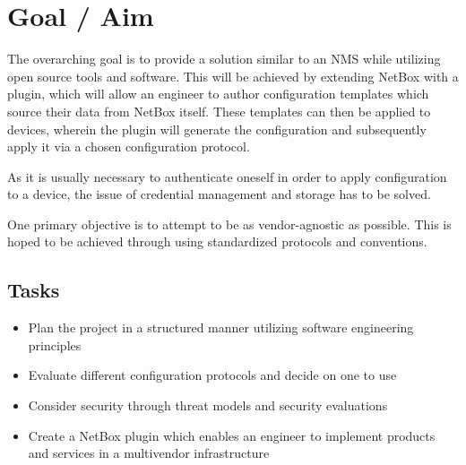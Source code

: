 \section{\label{introduction-goal}Goal / Aim}


The overarching goal is to provide a solution similar to an \acrshort{NMS} while utilizing open source
tools and software.
This will be achieved by extending NetBox with a plugin, which will allow an engineer to author configuration
templates which source their data from NetBox itself. 
These templates can then be applied to devices, wherein the plugin will generate the configuration and subsequently
apply it via a chosen configuration protocol.

As it is usually necessary to authenticate oneself in order to apply configuration to a device,
the issue of credential management and storage has to be solved.

One primary objective is to attempt to be as vendor-agnostic as possible. This is hoped to be achieved
through using standardized protocols and conventions.

\subsection{Tasks}

\begin{itemize}
    \item Plan the project in a structured manner utilizing software engineering principles
    \item Evaluate different configuration protocols and decide on one to use
    \item Consider security through threat models and security evaluations
    \item Create a NetBox plugin which enables an engineer to implement products and services
    in a multivendor infrastructure
\end{itemize}

